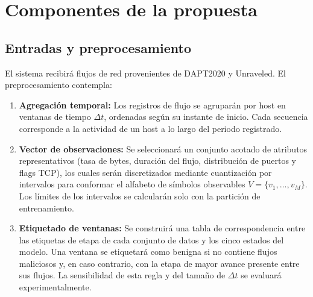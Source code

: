 \section{Componentes de la propuesta}

\subsection{Entradas y preprocesamiento}
El sistema recibirá flujos de red provenientes de DAPT2020 y Unraveled. El preprocesamiento contempla:
\begin{enumerate}
    \item \textbf{Agregación temporal:} Los registros de flujo se agruparán por host en ventanas de tiempo $\Delta t$, ordenadas según su instante de inicio. Cada secuencia corresponde a la actividad de un host a lo largo del periodo registrado.
    \item \textbf{Vector de observaciones:} Se seleccionará un conjunto acotado de atributos representativos (tasa de bytes, duración del flujo, distribución de puertos y flags TCP), los cuales serán discretizados mediante cuantización por intervalos para conformar el alfabeto de símbolos observables $V = \{v_1, \dots, v_M\}$. Los límites de los intervalos se calcularán solo con la partición de entrenamiento.
    \item \textbf{Etiquetado de ventanas:} Se construirá una tabla de correspondencia entre las etiquetas de etapa de cada conjunto de datos y los cinco estados del modelo. Una ventana se etiquetará como benigna si no contiene flujos maliciosos y, en caso contrario, con la etapa de mayor avance presente entre sus flujos. La sensibilidad de esta regla y del tamaño de $\Delta t$ se evaluará experimentalmente.
\end{enumerate}


